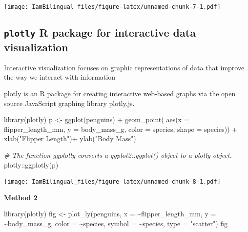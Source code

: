 \documentclass[
]{book}
\newenvironment{Shaded}{\begin{snugshade}}{\end{snugshade}}
\newcommand{\AttributeTok}[1]{\textcolor[rgb]{0.77,0.63,0.00}{#1}}
\newcommand{\CommentTok}[1]{\textcolor[rgb]{0.56,0.35,0.01}{\textit{#1}}}
\newcommand{\FunctionTok}[1]{\textcolor[rgb]{0.00,0.00,0.00}{#1}}
\newcommand{\NormalTok}[1]{#1}
\newcommand{\OtherTok}[1]{\textcolor[rgb]{0.56,0.35,0.01}{#1}}
\newcommand{\SpecialCharTok}[1]{\textcolor[rgb]{0.00,0.00,0.00}{#1}}
\newcommand{\StringTok}[1]{\textcolor[rgb]{0.31,0.60,0.02}{#1}}
\begin{document}
\texttt{[image: IamBilingual\_files/figure-latex/unnamed-chunk-7-1.pdf]}

\hypertarget{plotly-r-package-for-interactive-data-visualization}{%
\subsection{\texorpdfstring{\texttt{plotly} R package for interactive data visualization}{plotly R package for interactive data visualization}}\label{plotly-r-package-for-interactive-data-visualization}}

Interactive visualization focuses on graphic representations of data that improve the way we interact with information

plotly is an R package for creating interactive web-based graphs via the open source JavaScript graphing library plotly.js.

\begin{Shaded}
\begin{Highlighting}[]
\FunctionTok{library}\NormalTok{(plotly)}
\NormalTok{p }\OtherTok{\textless{}{-}} \FunctionTok{ggplot}\NormalTok{(penguins) }\SpecialCharTok{+}
  \FunctionTok{geom\_point}\NormalTok{( }\FunctionTok{aes}\NormalTok{(}\AttributeTok{x =}\NormalTok{ flipper\_length\_mm,}
                  \AttributeTok{y =}\NormalTok{ body\_mass\_g,}
                  \AttributeTok{color =}\NormalTok{ species,}
                  \AttributeTok{shape =}\NormalTok{ species)) }\SpecialCharTok{+}
  \FunctionTok{xlab}\NormalTok{(}\StringTok{"Flipper Length"}\NormalTok{)}\SpecialCharTok{+}
  \FunctionTok{ylab}\NormalTok{(}\StringTok{"Body Mass"}\NormalTok{)}

\CommentTok{\# The function ggplotly converts a ggplot2::ggplot() object to a plotly object.}
\NormalTok{plotly}\SpecialCharTok{::}\FunctionTok{ggplotly}\NormalTok{(p)}
\end{Highlighting}
\end{Shaded}

\texttt{[image: IamBilingual\_files/figure-latex/unnamed-chunk-8-1.pdf]}

\textbf{Method 2}

\begin{Shaded}
\begin{Highlighting}[]
\FunctionTok{library}\NormalTok{(plotly)}
\NormalTok{fig }\OtherTok{\textless{}{-}} \FunctionTok{plot\_ly}\NormalTok{(penguins, }
               \AttributeTok{x =} \SpecialCharTok{\textasciitilde{}}\NormalTok{flipper\_length\_mm,}
               \AttributeTok{y =} \SpecialCharTok{\textasciitilde{}}\NormalTok{body\_mass\_g, }
               \AttributeTok{color =} \SpecialCharTok{\textasciitilde{}}\NormalTok{species,}
               \AttributeTok{symbol =} \SpecialCharTok{\textasciitilde{}}\NormalTok{species,}
               \AttributeTok{type =} \StringTok{"scatter"}\NormalTok{)}
\NormalTok{fig}
\end{Highlighting}
\end{Shaded}
\end{document}
